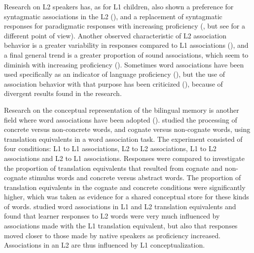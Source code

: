 \documentclass[output=paper,colorlinks,citecolor=brown,nonflat]{langsci/langscibook}
\begin{document}
Research on L2 speakers has, as for L1 children, also shown a preference for syntagmatic associations in the L2 (\citealt{Meara1978, Politzer1978}), and a replacement of syntagmatic responses for paradigmatic responses with increasing proficiency (\citealt{KhazaeenezhadAlibabaee2013}, but see \citealt{Wolter2001} for a different point of view). Another observed characteristic of L2 association behavior is a greater variability in responses compared to L1 associations (\citealt{RiegelZivian1972, Zareva2007}), and a final general trend is a greater proportion of sound associations, which seem to diminish with increasing proficiency (\citealt{RiegelZivian1972}). Sometimes word associations have been used specifically as an indicator of language proficiency (\citealt{RiegelZivian1972, Zareva2007}), but the use of association behavior with that purpose has been criticized (\citealt{KruseEtAl1987, CremerEtAl2010}), because of divergent results found in the research.

Research on the conceptual representation of the bilingual memory is another field where word associations have been adopted (\citealt{VanHellDeGroot1998, FitzpatrickIzura2011}).  studied the processing of concrete versus non-concrete words, and cognate versus non-cognate words, using translation equivalents in a word association task. The experiment consisted of four conditions: L1 to L1 associations, L2 to L2 associations, L1 to L2 associations and L2 to L1 associations. Responses were compared to investigate the proportion of translation equivalents that resulted from cognate and non-cognate stimulus words and concrete versus abstract words. The proportion of translation equivalents in the cognate and concrete conditions were significantly higher, which was taken as evidence for a shared conceptual store for these kinds of words. \citet{Verspoor2008} studied word associations in L1 and L2 translation equivalents and found that learner responses to L2 words were very much influenced by associations made with the L1 translation equivalent, but also that responses moved closer to those made by native speakers as proficiency increased. Associations in an L2 are thus influenced by L1 conceptualization.
\end{document}
